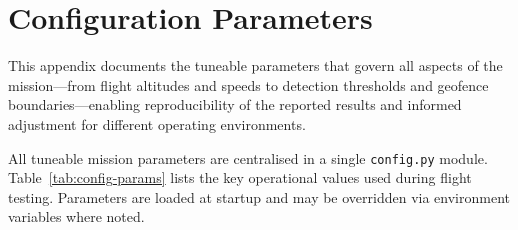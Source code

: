\section{Configuration Parameters}\label{app:config}

This appendix documents the tuneable parameters that govern all aspects of the mission---from flight altitudes and speeds to detection thresholds and geofence boundaries---enabling reproducibility of the reported results and informed adjustment for different operating environments.

All tuneable mission parameters are centralised in a single \texttt{config.py} module.
Table~\ref{tab:config-params} lists the key operational values used during flight testing.
Parameters are loaded at startup and may be overridden via environment variables where noted.

